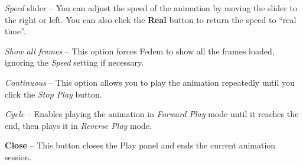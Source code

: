 \begin{bulletlist}
   \setcounter{enumi}{8}
 \item{\sl Speed} slider --
   You can adjust the speed of the animation by moving the slider to the right
   or left. You can also click the \textbf{Real} button to return the speed to
   ``real time''.

 \item{\sl Show all frames} --
   This option forces Fedem to show all the frames loaded,
   ignoring the {\sl Speed} setting if necessary.
 \item{\sl Continuous} --
   This option allows you to play the animation repeatedly until you click the
   {\sl Stop Play} button.
 \item{\sl Cycle} --
   Enables playing the animation in {\sl Forward Play}  mode until it reaches
   the end, then plays it in {\sl Reverse Play} mode.
 \item\textbf{Close} --
   This button closes the Play panel and ends the current animation session.
\end{bulletlist}


\clearpage



